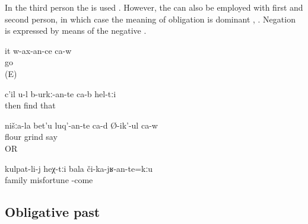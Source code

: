 In the third person the  is used . However, the  can also be employed with first and second person, in which case the meaning of obligation is dominant , . Negation is expressed by means of the negative  .
%
\begin{exe}
	\ex	\label{ex:He will go / have to go E}
	\gll	it	w-ax-an-ce	ca-w\\
			go	\\
	\glt	{} (E)

	\ex	\label{ex:Then you have to find them analytic}
	\gll	c'il	u-l	b-urkː-an-te	ca-b	hel-tːi\\
		then		find 		that\\
	\glt	{}

	\ex	\label{ex:Our flour we should / (will) grind, he says analytic}
	\gll	nišːa-la	bet'u	luq'-an-te ca-d	Ø-ik'-ul	ca-w\\
			flour	grind 		say	\\
	\glt	{} OR 

	\ex	\label{ex:‎To a family such misfortune should not happen analytic}
	\gll	kulpat-li-j	heχ-tːi	bala	či-ka-jʁ-an-te=kːu\\
		family		misfortune	-come\\
	\glt	{}
\end{exe}



\subsection{Obligative past}
\label{ssec:Obligative past}

